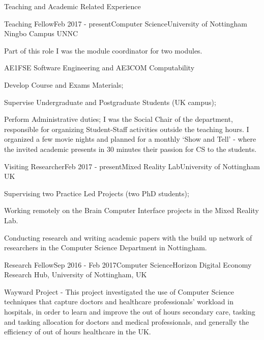 \documentclass{resume} %
\begin{document}
\begin{rSection}{Teaching and Academic Related Experience}
	\begin{rSubsection}{Teaching Fellow}{Feb 2017 - present}{Computer Science}{University of Nottingham Ningbo Campus UNNC}
			\item Part of this role I was the module coordinator for two modules.
			\item AE1FSE Software Engineering and AE3COM Computability
			\item Develop Course and  Exams Materials;
			\item Supervise Undergraduate and Postgraduate Students (UK campus);
			\item Perform Administrative duties; I was the Social Chair of the department, responsible for organizing Student-Staff activities outside the teaching hours. I organized a few movie nights and planned for a monthly `Show and Tell' - where the invited academic presents in 30 minutes their passion for CS to the students.
	\end{rSubsection}
	
	\begin{rSubsection}{Visiting Researcher}{Feb 2017 - present}{Mixed Reality Lab}{University of Nottingham UK}
		\item Supervising two Practice Led Projects (two PhD students);
		\item Working remotely on the Brain Computer Interface projects in the Mixed Reality Lab.
		\item Conducting research and writing academic papers with the build up network of researchers in the Computer Science Department in Nottingham.		
	\end{rSubsection}
	
	\begin{rSubsection}{Research Fellow}{Sep 2016 - Feb 2017}{Computer Science}{Horizon Digital Economy Research Hub, University of Nottingham, UK}
		\item Wayward Project -  This project investigated the use of Computer Science techniques that capture doctors and healthcare professionals' workload in hospitals, in order to learn and improve the out of hours secondary care, tasking and tasking allocation for doctors and medical professionals, and generally the efficiency of out of hours healthcare in the UK.
	\end{rSubsection}	
	

\end{rSection}
\end{document}
